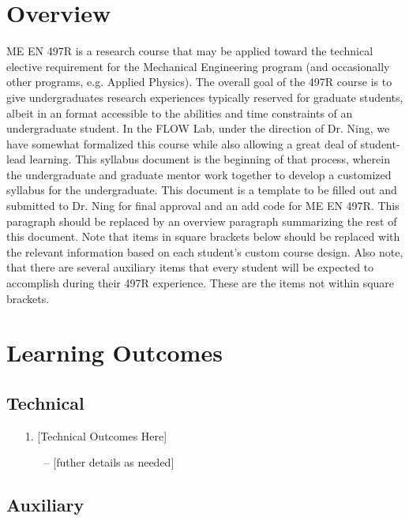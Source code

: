 \documentclass[12pt]{article}
\begin{document}
	
\section*{Overview}
ME EN 497R is a research course that may be applied toward the technical elective requirement for the Mechanical Engineering program (and occasionally other programs, e.g. Applied Physics).
The overall goal of the 497R course is to give undergraduates research experiences typically reserved for graduate students, albeit in an format accessible to the abilities and time constraints of an undergraduate student.
In the FLOW Lab, under the direction of Dr. Ning, we have somewhat formalized this course while also allowing a great deal of student-lead learning.
This syllabus document is the beginning of that process, wherein the undergraduate and graduate mentor work together to develop a customized syllabus for the undergraduate.
This document is a template to be filled out and submitted to Dr. Ning for final approval and an add code for ME EN 497R.
This paragraph should be replaced by an overview paragraph summarizing the rest of this document.
Note that items in square brackets below should be replaced with the relevant information based on each student's custom course design.
Also note, that there are several auxiliary items that every student will be expected to accomplish during their 497R experience.  These are the items not within square brackets.

\section*{Learning Outcomes}

\subsection*{Technical}


\begin{enumerate}
	\item[1.] [Technical Outcomes Here]
	\begin{itemize}
		\item[--] [futher details as needed]
	\end{itemize}
\end{enumerate}

\subsection*{Auxiliary}
\end{document}
